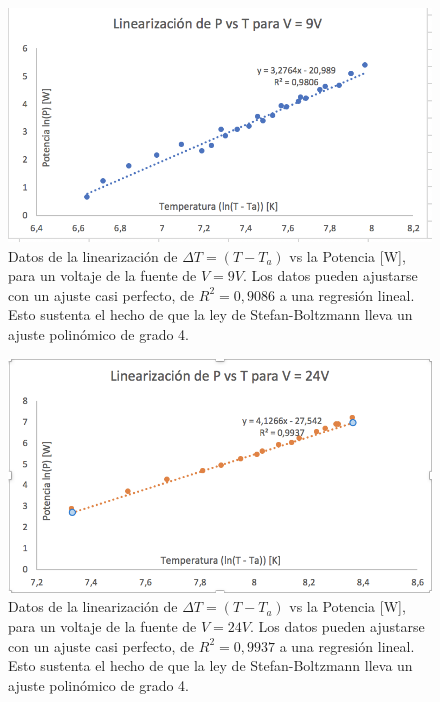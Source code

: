 \documentclass[%
 reprint,
 amsmath,amssymb,
 aps,
]{revtex4-1}
\begin{document}
\begin{figure}[H]
    \centering
    \includegraphics[scale= 0.5]{graf1lin.png}
    \caption{Datos de la linearización de $\Delta T = (T - T_{a})$ vs la Potencia [W], para un voltaje de la fuente de $V = 9 V$. Los datos pueden ajustarse con un ajuste casi perfecto, de $R^2 = 0,9086$ a una regresión lineal. Esto sustenta el hecho de que la ley de Stefan-Boltzmann lleva un ajuste polinómico de grado 4.}
    \label{fig:Figura 5}
\end{figure}

\begin{figure}[H]
    \centering
    \includegraphics[scale= 0.5]{graf2lin.png}
    \caption{Datos de la linearización de $\Delta T = (T - T_{a})$ vs la Potencia [W], para un voltaje de la fuente de $V = 24 V$. Los datos pueden ajustarse con un ajuste casi perfecto, de $R^2 = 0,9937$ a una regresión lineal. Esto sustenta el hecho de que la ley de Stefan-Boltzmann lleva un ajuste polinómico de grado 4.}
    \label{fig:Figura 5}
\end{figure}
\end{document}
